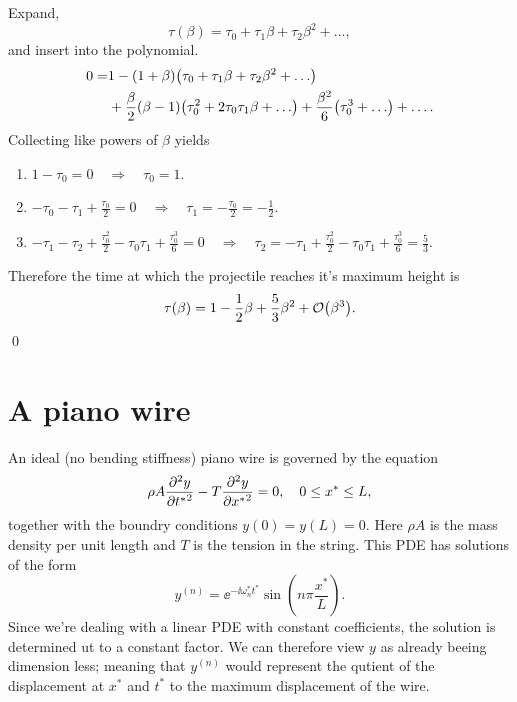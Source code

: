 \documentclass[11pt,letter, swedish, english
]{article}
\begin{document}
Expand,
\begin{equation}
\tau(\beta) = \tau_0 + \tau_1\beta + \tau_2\beta^2 +\ldots,
\end{equation}
and insert into the polynomial. 
\begin{equation}
\begin{aligned}
0=&1 - (1+\beta)\qty(\tau_0+\tau_1\beta + \tau_2\beta^2+\ldots)\\
&+ \frac{\beta}{2}\qty(\beta -1)\qty(\tau_0^2+2\tau_0\tau_1\beta+\ldots)
+\frac{\beta^2}{6}\qty(\tau_0^3+\ldots) + \ldots.
\end{aligned}
\end{equation}
Collecting like powers of $\beta$
yields
\begin{enumerate}[label=$\order{\beta^{\arabic*}}$: , start=0, leftmargin=2cm]
\item $\displaystyle 1-\tau_0 = 0 \quad\Longrightarrow\quad
\tau_0=1$.
\item $\displaystyle -\tau_0-\tau_1+\frac{\tau_0}{2} = 0 \quad\Longrightarrow\quad
\tau_1= -\frac{\tau_0}{2} = -\frac{1}{2}$.
\item $\displaystyle -\tau_1-\tau_2+\frac{\tau_0^2}{2}-\tau_0\tau_1 +\frac{\tau_0^3}{6}= 0 \quad\Longrightarrow\quad
\tau_2=-\tau_1+\frac{\tau_0^2}{2}-\tau_0\tau_1 +\frac{\tau_0^3}{6} = \frac{5}{3}$.
\end{enumerate}
Therefore the time at which the projectile reaches it's maximum height
is 
\begin{equation}
\tau(\beta) = 1 - \frac{1}{2}\beta + \frac{5}{3}\beta^2 + \order{\beta^3}.
\end{equation}
\qed


\section{A piano wire}
\newcommand{\yn}{\ensuremath{}y^{(n)}}

An ideal (no bending stiffness) piano wire is governed by the equation
\begin{equation}
\rho A \pdv[2]{y}{{t^*}} - T\pdv[2]{y}{{x^*}} = 0 \qcomma 0\le x^*\le L,
\end{equation}
together with the boundry conditions $y(0)=y(L)=0$. Here $\rho A$ is
the mass density per unit length and $T$ is the tension in the
string. This PDE has solutions of the form
\begin{equation}
\yn=\ee^{-\ii\omega_n^*t^*}\sin(n\pi\frac{x^*}{L}).
\end{equation}
Since we're dealing with a linear PDE with constant coefficients, the
solution is determined ut to a constant factor. We can therefore view
$y$ as already beeing dimension less; meaning that $\yn$ would
represent the qutient of the displacement at $x^*$ and $t^*$ to the
maximum displacement of the wire. 
\end{document}
